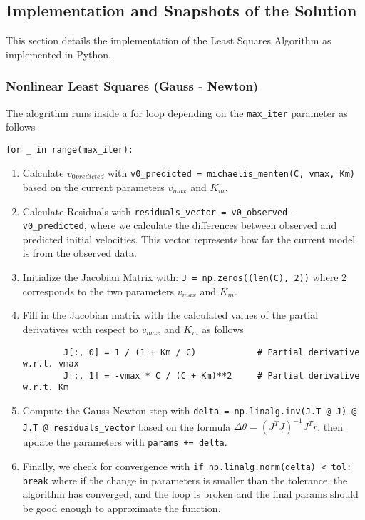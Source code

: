 \documentclass{article} %
\theoremstyle{definition}
\theoremstyle{remark}
\theoremstyle{plain}
\begin{document}
\subsection{Implementation and Snapshots of the Solution}
This section details the implementation of the Least Squares Algorithm as implemented in Python. 

\subsubsection{Nonlinear Least Squares (Gauss - Newton)}
The alogrithm runs inside a for loop depending on the \verb|max_iter| parameter as follows

\verb|for _ in range(max_iter):|
\begin{enumerate}
    \item Calculate $v_{0 predicted}$ with \verb|v0_predicted = michaelis_menten(C, vmax, Km)| based on the current parameters $v_{max}$ and $K_m$.
    \item Calculate Residuals with \verb|residuals_vector = v0_observed - v0_predicted|, where we calculate the differences between observed and predicted initial velocities. This vector represents how far the current model is from the observed data.
    \item Initialize the Jacobian Matrix with: \verb|J = np.zeros((len(C), 2))| where $2$ corresponds to the two parameters $v_{max}$ and $K_m$.
    \item Fill in the Jacobian matrix with the calculated values of the partial derivatives with respect to $v_{max}$ and $K_m$ as follows
    \begin{verbatim}
        J[:, 0] = 1 / (1 + Km / C)            # Partial derivative w.r.t. vmax
        J[:, 1] = -vmax * C / (C + Km)**2     # Partial derivative w.r.t. Km
    \end{verbatim}  
    \item Compute the Gauss-Newton step with \verb|delta = np.linalg.inv(J.T @ J) @ J.T @ residuals_vector| based on the formula $\Delta \theta = (J^T J)^{-1} J^T r$, then update the parameters with \verb|params += delta|.
    \item Finally, we check for convergence with \verb|if np.linalg.norm(delta) < tol: break| where if the change in parameters is smaller than the tolerance, the algorithm has converged, and the loop is broken and the final params should be good enough to approximate the function.
    
\end{enumerate}
\end{document}
